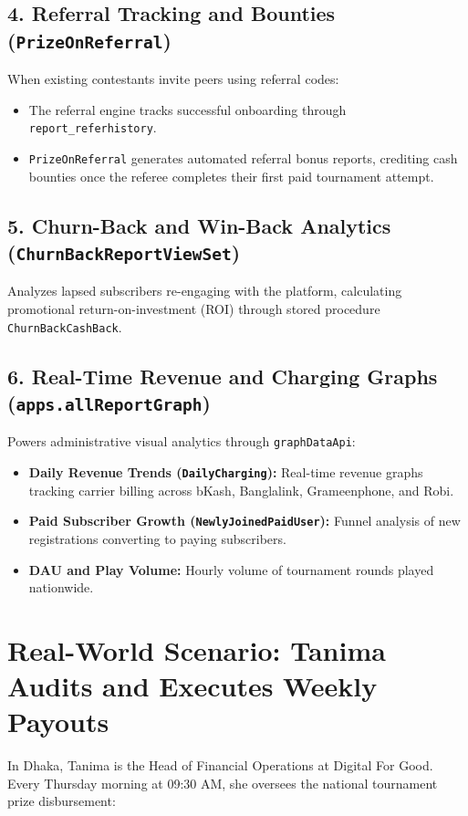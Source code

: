 \subsection{4. Referral Tracking and Bounties (\texttt{PrizeOnReferral})}
When existing contestants invite peers using referral codes:
\begin{itemize}
    \item The referral engine tracks successful onboarding through \texttt{report\_referhistory}.
    \item \texttt{PrizeOnReferral} generates automated referral bonus reports, crediting cash bounties once the referee completes their first paid tournament attempt.
\end{itemize}

\subsection{5. Churn-Back and Win-Back Analytics (\texttt{ChurnBackReportViewSet})}
Analyzes lapsed subscribers re-engaging with the platform, calculating promotional return-on-investment (ROI) through stored procedure \texttt{ChurnBackCashBack}.

\subsection{6. Real-Time Revenue and Charging Graphs (\texttt{apps.allReportGraph})}
Powers administrative visual analytics through \texttt{graphDataApi}:
\begin{itemize}
    \item \textbf{Daily Revenue Trends (\texttt{DailyCharging}):} Real-time revenue graphs tracking carrier billing across bKash, Banglalink, Grameenphone, and Robi.
    \item \textbf{Paid Subscriber Growth (\texttt{NewlyJoinedPaidUser}):} Funnel analysis of new registrations converting to paying subscribers.
    \item \textbf{DAU and Play Volume:} Hourly volume of tournament rounds played nationwide.
\end{itemize}

\section{Real-World Scenario: Tanima Audits and Executes Weekly Payouts}
In Dhaka, Tanima is the Head of Financial Operations at Digital For Good. Every Thursday morning at 09:30 AM, she oversees the national tournament prize disbursement:

